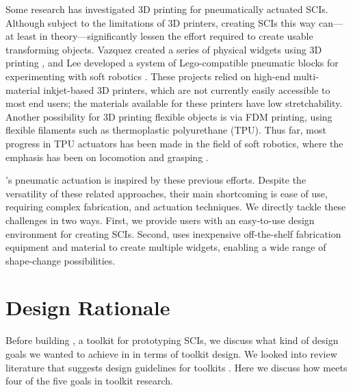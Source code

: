       Some research has investigated 3D printing for pneumatically actuated
      SCIs. Although subject to the limitations of 3D printers, creating SCIs
      this way can---at least in theory---significantly lessen the effort
      required to create usable transforming objects. Vazquez \etal created a
      series of physical widgets using 3D printing \cite{Vazquez:2015dm}, and
      Lee \etal developed a system of Lego-compatible pneumatic blocks for
      experimenting with soft robotics \cite{Lee:2018}. These projects relied on
      high-end multi-material inkjet-based 3D printers, which are not currently
      easily accessible to most end users; the materials available for these
      printers have low stretchability. Another possibility for 3D printing
      flexible objects is via FDM printing, using flexible filaments such as
      thermoplastic polyurethane (TPU). Thus far, most progress in TPU actuators
      has been made in the field of soft robotics, where the emphasis has been
      on locomotion and grasping \cite{Yap:2016}.
      
      \mp's pneumatic actuation is inspired by these previous efforts. Despite
      the versatility of these related approaches, their main shortcoming is
      ease of use, requiring complex fabrication, and actuation techniques. We
      directly tackle these challenges in two ways. First, we provide users with
      an easy-to-use design environment for creating SCIs. Second, \mp uses
      inexpensive off-the-shelf fabrication equipment and material to create
      multiple widgets, enabling a wide range of shape-change possibilities.

  \section{Design Rationale} 
    Before building \mp, a toolkit for prototyping SCIs, we discuss what
    kind of design goals we wanted to achieve in \mp in terms of toolkit design.
    We looked into review literature that suggests design guidelines for
    toolkits \cite{10.1145/3173574.3173610}. Here we discuss how \mp meets four
    of the five goals in toolkit research.
      
